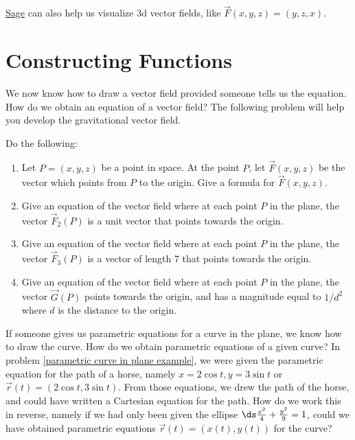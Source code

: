 \href{http://aleph.sagemath.org/?z=eJxz06jQqdSp0lSwVdAA0joVmlwFOfkl8WWpySX5RfFpmak5KcYpGm46CkCFusY6xpo6IIUQlkYVhKEJAOGFExs}{Sage} can also help us visualize 3d vector fields, like $\vec F(x,y,z)=(y,z,x)$. 

\section{Constructing Functions}
We now know how to draw a vector field provided someone tells us the equation. How do we obtain an equation of a vector field? The following problem will help you develop the gravitational vector field.

\begin{problem}
%
Do the following:
\begin{enumerate}
 \item Let $P=(x,y,z)$ be a point in space.  At the point $P$, let $\vec F(x,y,z)$ be the vector which points from $P$ to the origin.  Give a formula for $\vec F(x,y,z)$.
 \item Give an equation of the vector field where at each point $P$ in the plane, the vector $\vec F_2(P)$ is a unit vector that points towards the origin.
 \item Give an equation of the vector field where at each point $P$ in the plane, the vector $\vec F_3(P)$ is a vector of length 7 that points towards the origin.
 \item Give an equation of the vector field where at each point $P$ in the plane, the vector $\vec G(P)$ points towards the origin, and has a magnitude equal to $1/d^2$ where $d$ is the distance to the origin.
\end{enumerate}
\end{problem}

If someone gives us parametric equations for a curve in the plane, we know how to draw the curve.  How do we obtain parametric equations of a given curve? In problem \ref{parametric curve in plane example}, we were given the parametric equation for the path of a horse, namely $x=2\cos t, y=3 \sin t$ or $\vec r(t)=(2\cos t,3\sin t)$. From those equations, we drew the path of the horse, and could have written a Cartesian equation for the path. How do we work this in reverse, namely if we had only been given the ellipse $\ds\frac{x^2}{4}+\frac{y^2}{9}=1$, could we have obtained parametric equations $\vec r(t)=(x(t),y(t))$ for the curve?

